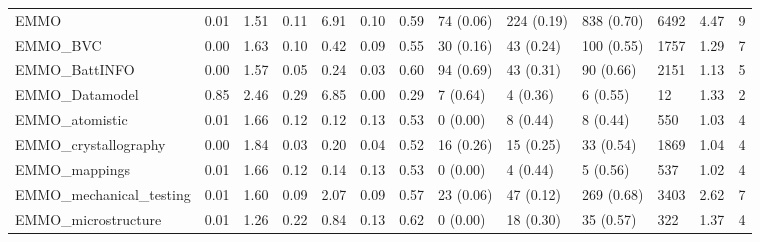 \begin{table}
\begin{tabular}{m{3.5cm}m{2cm}m{2cm}m{2cm}m{2cm}m{2cm}m{2cm}m{2cm}m{2cm}m{2cm}m{2cm}m{2cm}m{2cm}}
EMMO                    &                0.01 &                  1.51 &                   0.11 &               6.91 &               0.10 &                  0.59 &      74 (0.06) &  224 (0.19) &   838 (0.70) &            6492 &     4.47 &          9 \\
EMMO\_BVC                &                0.00 &                  1.63 &                   0.10 &               0.42 &               0.09 &                  0.55 &      30 (0.16) &   43 (0.24) &   100 (0.55) &            1757 &     1.29 &          7 \\
EMMO\_BattINFO           &                0.00 &                  1.57 &                   0.05 &               0.24 &               0.03 &                  0.60 &      94 (0.69) &   43 (0.31) &    90 (0.66) &            2151 &     1.13 &          5 \\
EMMO\_Datamodel          &                0.85 &                  2.46 &                   0.29 &               6.85 &               0.00 &                  0.29 &       7 (0.64) &    4 (0.36) &     6 (0.55) &              12 &     1.33 &          2 \\
EMMO\_atomistic          &                0.01 &                  1.66 &                   0.12 &               0.12 &               0.13 &                  0.53 &       0 (0.00) &    8 (0.44) &     8 (0.44) &             550 &     1.03 &          4 \\
EMMO\_crystallography    &                0.00 &                  1.84 &                   0.03 &               0.20 &               0.04 &                  0.52 &      16 (0.26) &   15 (0.25) &    33 (0.54) &            1869 &     1.04 &          4 \\
EMMO\_mappings           &                0.01 &                  1.66 &                   0.12 &               0.14 &               0.13 &                  0.53 &       0 (0.00) &    4 (0.44) &     5 (0.56) &             537 &     1.02 &          4 \\
EMMO\_mechanical\_testing &                0.01 &                  1.60 &                   0.09 &               2.07 &               0.09 &                  0.57 &      23 (0.06) &   47 (0.12) &   269 (0.68) &            3403 &     2.62 &          7 \\
EMMO\_microstructure     &                0.01 &                  1.26 &                   0.22 &               0.84 &               0.13 &                  0.62 &       0 (0.00) &   18 (0.30) &    35 (0.57) &             322 &     1.37 &          4 \\

\end{tabular}
\end{table}
